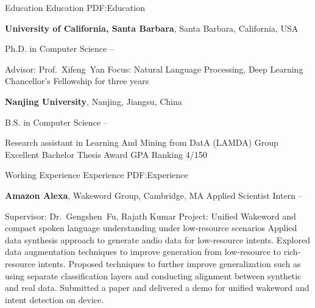 \documentclass[letterpaper,MMMyyyy,nonstopmode]{simpleresumecv}
\begin{document}
\begin{Body}

\Section
{Education}
{Education}
{PDF:Education}

\Entry
\textbf{University of California, Santa Barbara},
Santa Barbara, California, USA

\Gap
\BulletItem
Ph.D. in Computer Science
\hfill
{} -- 
\begin{Detail}
\SubBulletItem
Advisor:
Prof.~Xifeng~Yan
\SubBulletItem
Focus:
Natural Language Processing, Deep Learning
\SubBulletItem
Chancellor's Fellowship for three years
\end{Detail}

\BigGap
\Entry
\textbf{Nanjing University},
Nanjing, Jiangsu, China

\Gap
\BulletItem
B.S. in Computer Science
\hfill
{} --
\begin{Detail}
\SubBulletItem
Research assistant in Learning And Mining from DatA (LAMDA) Group
\SubBulletItem
Excellent Bachelor Thesis Award
\SubBulletItem
GPA Ranking 4/150

\end{Detail}


\Section
{Working Experience}
{Experience}
{PDF:Experience}

\BigGap
\Entry
\textbf{Amazon Alexa},
Wakeword Group, Cambridge, MA
\BulletItem
Applied Scientist Intern
\hfill
{} --
\begin{Detail}
\SubBulletItem
Supervisor:
Dr.~Gengshen~Fu, Rajath Kumar
\SubBulletItem
Project: Unified Wakeword and compact spoken language understanding under low-resource scenarios
\SubBulletItem
Applied data synthesis approach to generate audio data for low-resource intents.
\SubBulletItem
Explored data augmentation techniques to improve generation from low-resource to rich-resource intents.
\SubBulletItem
Proposed techniques to further improve generalization such as using separate classification layers and conducting alignment between synthetic and real data.
\SubBulletItem
Submitted a paper and delivered a demo for unified wakeword and intent detection on device.

\end{Detail}


\end{Body}
\end{document}
